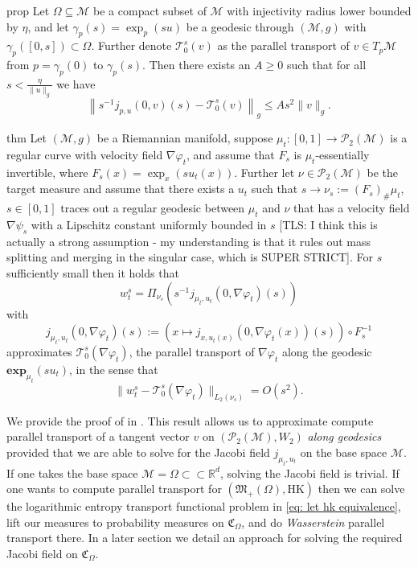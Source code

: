 \documentclass{article}
\newcommand{\man}{\mathcal{M}}
\newcommand{\tls}[1]{{\color{cyan}[TLS: #1]}}
\begin{document}
\begin{restatable}{prop}{} \label{fanning approximation}
    Let $\Omega \subseteq \man$ be a compact subset of $\man$ with injectivity radius lower bounded by $\eta$, and let $\gamma_p(s) = \exp_p(su)$ be a geodesic through $(\man, g)$ with $\gamma_p([0, s]) \subset \Omega$. Further denote $\mathcal{T}_0^s(v)$ as the parallel transport of $v \in T_{p}\man$ from $p = \gamma_p(0)$ to $\gamma_p(s)$. Then there exists an $A \geq 0$ such that for all $s < \frac{\eta}{\|u\|_g}$ we have   
    \[\left\|s^{-1}j_{p, u}(0, v)(s) - \mathcal{T}_0^s(v)\right\|_g \leq As^2\|v\|_g. \]
\end{restatable}

\begin{restatable}[Approximation of $\mathcal{P}_{2}(\man)$ Parallel Transport]{thm}{}\label{parallel transport approx result} 
    Let $(\man, g)$ be a Riemannian manifold, suppose $\mu_t: [0, 1] \rightarrow \mathcal{P}_{2}(\man)$ is a regular curve with velocity field $\nabla \varphi_t$, and assume that $F_s$ is $\mu_t$-essentially invertible, where $F_s(x) = \exp_x(su_t(x))$. Further let $\nu \in \mathcal{P}_{2}(\man)$ be the target measure and assume that there exists a $u_t$ such that $s \rightarrow \nu_s := \left(F_s\right)_\# \mu_t$, $s \in [0, 1]$ traces out a regular geodesic between $\mu_t$ and $\nu$ that has a velocity field $\nabla\psi_s$ with a Lipschitz constant uniformly bounded in $s$ \tls{I think this is actually a strong assumption - my understanding is that it rules out mass splitting and merging in the singular case, which is SUPER STRICT}. For $s$ sufficiently small then it holds that 
    \[w_t^s = \Pi_{\nu_s}\left(s^{-1}j_{\mu_t, u_t}\left(0, \nabla\varphi_t\right)(s) \right)\]
    with
    \[j_{\mu_t, u_t}\left(0, \nabla\varphi_t\right)(s) := \left(x \mapsto j_{x, u_t(x)}\left(0, \nabla\varphi_t(x)\right)(s)\right) \circ F_s^{-1}\]
    approximates $\mathcal{T}_0^s(\nabla \varphi_t)$, the parallel transport of $\nabla\varphi_t$ along the geodesic $\textbf{exp}_{\mu_t}(su_t)$, in the sense that
    \[\|w_t^s - \mathcal{T}_0^s(\nabla\varphi_t)\|_{L_2(\nu_s)} = O(s^2).\]
\end{restatable}

We provide the proof of  in . This result allows us to approximate compute parallel transport of a tangent vector $v$ on $(\mathcal{P}_{2}(\man), W_2)$ \textit{along geodesics} provided that we are able to solve for the Jacobi field $j_{\mu_t, u_t}$ on the base space $\man$. If one takes the base space $\man = \Omega \subset \subset \mathbb{R}^d$, solving the Jacobi field is trivial. If one wants to compute parallel transport for $(\mathfrak{M}_+(\Omega) ,\text{HK})$ then we can solve the logarithmic entropy transport functional problem in \cref{eq: let hk equivalence}, lift our measures to probability measures on $\mathfrak{C}_{\Omega}$, and do \textit{Wasserstein} parallel transport there. In a later section we detail an approach for solving the required Jacobi field on $\mathfrak{C}_{\Omega}$.  
\end{document}

